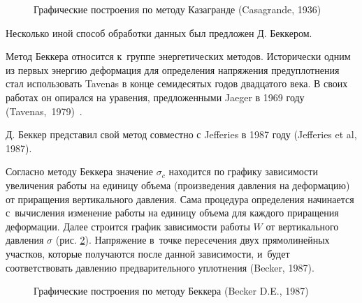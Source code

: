  \begin{figure}[ht]
  \centering
  \small

  
  \caption{Графические построения по методу Казагранде (Casagrande, 1936) \cite{casagrande1936}}
  \label{eq:caz}
\end{figure}


Несколько иной способ обработки данных был предложен Д. Беккером. 

Метод Беккера относится к~группе энергетических методов.
Исторически одним из первых энергию деформация для определения напряжения предуплотнения стал использовать Tavenаs в конце семидесятых годов двадцатого века. В своих работах он опирался на уравения, предложенными Jaeger в 1969 году (Tavenas,~1979)~\cite{tavenas1979}.

Д. Беккер представил свой метод совместно с Jefferies в 1987 году (Jefferies et al, 1987)\cite{jeff1987}.

Согласно методу Беккера значение $\sigma_c$ находится по графику зависимости увеличения работы на единицу объема (произведения давления на деформацию) от приращения вертикального давления. 
Сама процедура определения начинается с~вычисления изменение работы на единицу объема для каждого приращения деформации. 
Далее строится график зависимости работы $W$ от вертикального давления $\sigma$ (рис. \ref{eq:beck}). 
Напряжение в~точке пересечения двух прямолинейных участков, 
которые получаются после данной зависимости, 
и~будет соответствовать давлению предварительного уплотнения (Becker, 1987)\cite{becker1987}.

\begin{figure}[ht]
  \centering
  \small
  
  \caption{Графические построения по методу Беккера (Becker D.E., 1987) \cite{becker1987}}
  \label{eq:beck}
\end{figure}


